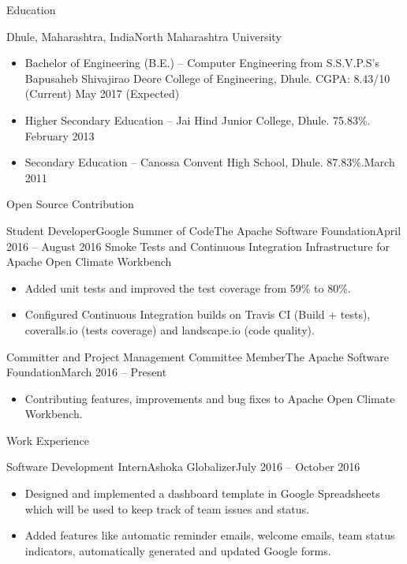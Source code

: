 \documentclass[]{mcdowellcv}
\begin{document}
	\makeheader

	\begin{cvsection}{Education}
		\begin{cvsubsection}{Dhule, Maharashtra, India}{North Maharashtra University}{}
			\begin{itemize}
				\item Bachelor of Engineering (B.E.) -- Computer Engineering from S.S.V.P.S's Bapusaheb Shivajirao Deore College of Engineering, Dhule. CGPA: 8.43/10 (Current) \hfill May 2017 (Expected)
				\item Higher Secondary Education -- Jai Hind Junior College, Dhule. 75.83\%. \hfill February 2013
				\item Secondary Education -- Canossa Convent High School, Dhule. 87.83\%.\hfill March 2011
			\end{itemize}
		\end{cvsubsection}
	\end{cvsection}

	\begin{cvsection}{Open Source Contribution}
		\begin{cvsubsection}[2]{Student Developer\linebreak Google Summer of Code}{The Apache Software Foundation}{April 2016 -- August 2016}
			Smoke Tests and Continuous Integration Infrastructure for Apache Open Climate Workbench
			\begin{itemize}
				\item Added unit tests and improved the test coverage from 59\% to 80\%.
				\item Configured Continuous Integration builds on Travis CI (Build + tests), coveralls.io (tests coverage) and landscape.io (code quality).
			\end{itemize}
		\end{cvsubsection}
		
		\begin{cvsubsection}[2]{Committer and Project Management Committee Member}{The Apache Software Foundation}{March 2016 -- Present}
			\begin{itemize}
				\item Contributing features, improvements and bug fixes to Apache Open Climate Workbench.
			\end{itemize}
		\end{cvsubsection}
	\end{cvsection}
	\begin{cvsection}{Work Experience}
		\begin{cvsubsection}{Software Development Intern}{Ashoka Globalizer}{July 2016 -- October 2016}
			\begin{itemize}
				\item Designed and implemented a dashboard template in Google Spreadsheets which will be used to keep track of team issues and status.
				\item Added features like automatic reminder emails, welcome emails, team status indicators, automatically generated and updated Google forms.
			\end{itemize}
		\end{cvsubsection}
	\end{cvsection}
	
\end{document}
